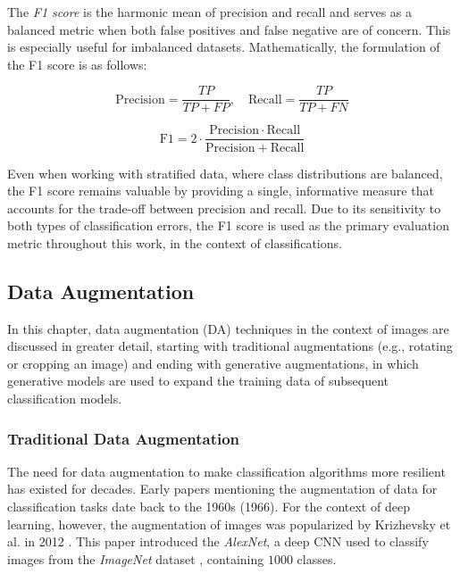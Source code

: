 The \textit{F1 score} is the harmonic mean of precision and recall and serves as a balanced metric when both false positives and false negative are of concern. This is especially useful for imbalanced datasets. Mathematically, the formulation of the F1 score is as follows: 

\begin{equation}
    \mathrm{Precision} = \frac{TP}{TP + FP}, \quad \mathrm{Recall} = \frac{TP}{TP + FN}
\end{equation}

\begin{equation}
    \mathrm{F1} = 2 \cdot \frac{\mathrm{Precision} \cdot \mathrm{Recall}}{\mathrm{Precision} + \mathrm{Recall}}
\end{equation}    

Even when working with stratified data, where class distributions are balanced, the F1 score remains valuable by providing a single, informative measure that accounts for the trade-off between precision and recall. Due to its sensitivity to both types of classification errors, the F1 score is used as the primary evaluation metric throughout this work, in the context of classifications.



\subsection[Data Augmentation - DA]{Data Augmentation}\label{theoretical_da}
In this chapter, data augmentation (DA) techniques in the context of images are discussed in greater detail, starting with traditional augmentations (e.g., rotating or cropping an image) and ending with generative augmentations, in which generative models are used to expand the training data of subsequent classification models.

\subsubsection[Traditional Data Augmentation - TDA]{Traditional Data Augmentation}\label{theoretical_tda}
The need for data augmentation to make classification algorithms more resilient has existed for decades. Early papers mentioning the augmentation of data for classification tasks date back to the 1960s \cite{Nagy1966} (1966). For the context of deep learning, however, the augmentation of images was popularized by Krizhevsky et al. in 2012 \cite{Krizhevsky2012traditionaldataaugmentation}. This paper introduced the \textit{AlexNet}, a deep CNN used to classify images from the \textit{ImageNet} dataset \cite{ImageNetDataset5206848}, containing $1 000$ classes. 

